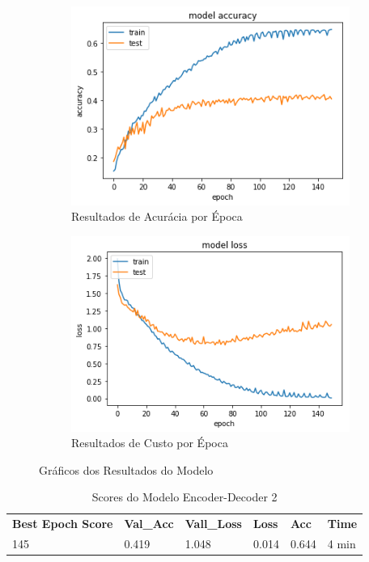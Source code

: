 \begin{figure}[H]
  \centering
  \begin{subfigure}[b]{0.45\linewidth}
    \includegraphics[width=\linewidth]{img/enc-dec-2.png}
    \caption{Resultados de Acurácia por Época}
  \end{subfigure}
  \begin{subfigure}[b]{0.45\linewidth}
    \includegraphics[width=\linewidth]{img/enc-dec-2-loss.png}
    \caption{Resultados de Custo por Época}
  \end{subfigure}
  \caption{Gráficos dos Resultados do Modelo}
  \label{fig:plots2}
\end{figure}

\begin{table}[H]
\centering
\begin{tabular}{llllll}
\textbf{Best Epoch Score} & \textbf{Val\_Acc} & \textbf{Vall\_Loss} & \textbf{Loss} & \textbf{Acc} & \textbf{Time} \\
145 & 0.419 & 1.048 & 0.014 & 0.644 & 4 min
\end{tabular}
\caption{Scores do Modelo Encoder-Decoder 2}
\label{tab:res-enc-dec-2}
\end{table}

